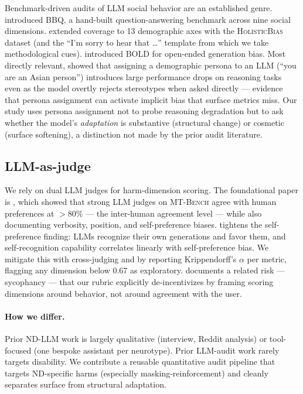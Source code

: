 \documentclass[11pt,letterpaper]{article}
\begin{document}
Benchmark-driven audits of LLM social behavior are an established genre. \citet{parrish2022} introduced \textsc{BBQ}, a hand-built question-answering benchmark across nine social dimensions. \citet{smith2022} extended coverage to 13 demographic axes with the \textsc{HolisticBias} dataset (and the ``I'm sorry to hear that \ldots'' template from which we take methodological cues). \citet{dhamala2021} introduced \textsc{BOLD} for open-ended generation bias. Most directly relevant, \citet{gupta2024persona} showed that assigning a demographic persona to an LLM (``you are an Asian person'') introduces large performance drops on reasoning tasks even as the model overtly rejects stereotypes when asked directly --- evidence that persona assignment can activate implicit bias that surface metrics miss. Our study uses persona assignment not to probe reasoning degradation but to ask whether the model's \emph{adaptation} is substantive (structural change) or cosmetic (surface softening), a distinction not made by the prior audit literature.

\subsection{LLM-as-judge}

We rely on dual LLM judges for harm-dimension scoring. The foundational paper is \citet{zheng2023}, which showed that strong LLM judges on \textsc{MT-Bench} agree with human preferences at $>80\%$ --- the inter-human agreement level --- while also documenting verbosity, position, and self-preference biases. \citet{panickssery2024} tightens the self-preference finding: LLMs recognize their own generations and favor them, and self-recognition capability correlates linearly with self-preference bias. We mitigate this with cross-judging and by reporting Krippendorff's $\alpha$ per metric, flagging any dimension below 0.67 as exploratory. \citet{sharma2023sycophancy} documents a related risk --- sycophancy --- that our rubric explicitly de-incentivizes by framing scoring dimensions around behavior, not around agreement with the user.

\paragraph{How we differ.} Prior ND-LLM work is largely qualitative (interview, Reddit analysis) or tool-focused (one bespoke assistant per neurotype). Prior LLM-audit work rarely targets disability. We contribute a reusable quantitative audit pipeline that targets ND-specific harms (especially masking-reinforcement) and cleanly separates surface from structural adaptation.
\end{document}
